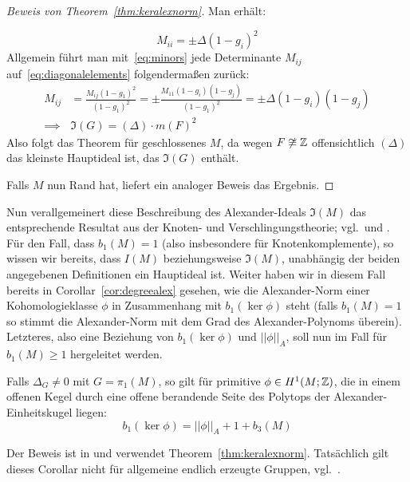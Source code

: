 \begin{proof}[Beweis von Theorem~\ref{thm:keralexnorm}]
	Man erhält:
	
	\begin{equation}
		M_{ii}= \pm \Delta (1-g_i)^2 \label{eq:diagonalelements}
	\end{equation}
	Allgemein führt man mit~\eqref{eq:minors} jede Determinante $M_{ij}$ auf~\eqref{eq:diagonalelements} folgendermaßen zurück:
	\begin{align*}
		M_{ij} &= \frac{M_{ij}(1-g_1)^2}{(1-g_1)^2} 
				= \pm \frac{M_{11}(1-g_i)(1-g_j)}{(1-g_1)^2}
				= \pm \Delta (1-g_i)(1-g_j)\\
		\implies &\mathfrak I(G) = (\Delta) \cdot m(F)^2 
	\end{align*}
	Also folgt das Theorem für geschlossenes $M$, da wegen $F\not\cong\mathbb{Z}$ offensichtlich $(\Delta)$ das kleinste Hauptideal ist, das $\mathfrak I(G)$ enthält.

	Falls $M$ nun Rand hat, liefert ein analoger Beweis das Ergebnis. 
\end{proof} 
Nun verallgemeinert diese Beschreibung des Alexander-Ideals $\mathfrak I(M)$ das entsprechende Resultat aus der Knoten- und Verschlingungstheorie; vgl.\,\cite[Proposition~8.11]{Burde.2003} und \cite[Proposition~9.16]{Burde.2003}. Für den Fall, dass $b_1(M)=1$ (also insbesondere für Knotenkomplemente), so wissen wir bereits, dass $I(M)$ beziehungsweise $\mathfrak I(M)$, unabhängig der beiden angegebenen Definitionen ein Hauptideal ist. Weiter haben wir in diesem Fall bereits in Corollar~\ref{cor:degreealex} gesehen, wie die Alexander-Norm einer Kohomologieklasse $\phi$ in Zusammenhang mit $b_1(\ker \phi)$ steht (falls $b_1(M)=1$ so stimmt die Alexander-Norm mit dem Grad des Alexander-Polynoms überein). Letzteres, also eine Beziehung von $b_1(\ker\phi)$ und $||\phi||_A$, soll nun im Fall für $b_1(M)\geq 1$ hergeleitet werden.

\begin{cor}
\label{cor:alexnorm}
	Falls $\Delta_G \neq 0$ mit $G=\pi_1(M)$, so gilt für primitive $\phi \in H^1(M;\mathbb{Z})$, die in einem offenen Kegel durch eine offene berandende Seite des Polytops der Alexander-Einheitskugel liegen:
	\[
		b_1(\ker\phi) = ||\phi||_A + 1 + b_3(M)
	\]
\end{cor}
Der Beweis ist in \cite[Theorem 4.1]{MCMULLEN.2002} und verwendet Theorem~\ref{thm:keralexnorm}. Tatsächlich gilt dieses Corollar nicht für allgemeine endlich erzeugte Gruppen, vgl.\ \cite[Seite 159]{MCMULLEN.2002}.
